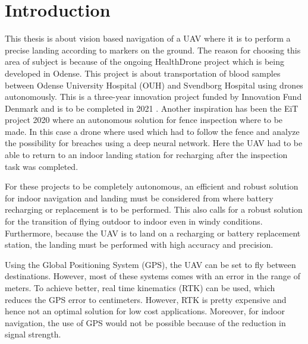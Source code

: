 \documentclass[../Head/report.tex]{subfiles}
\begin{document}
\section{Introduction}

This thesis is about vision based navigation of a UAV where it is to perform a precise landing according to markers on the ground. The reason for choosing this area of subject is because of the ongoing HealthDrone project which is being developed in Odense. This project is about transportation of blood samples between Odense University Hospital (OUH) and Svendborg Hospital using drones autonomously. This is a three-year innovation project funded by Innovation Fund Denmark and is to be completed in 2021 \cite{HealthDrone}. Another inspiration has been the EiT project 2020 where an autonomous solution for fence inspection where to be made. In this case a drone where used which had to follow the fence and analyze the possibility for breaches using a deep neural network. Here the UAV had to be able to return to an indoor landing station for recharging after the inspection task was completed.     

For these projects to be completely autonomous, an efficient and robust solution for indoor navigation and landing must be considered from where battery recharging or replacement is to be performed. This also calls for a robust solution for the transition of flying outdoor to indoor even in windy conditions. Furthermore, because the UAV is to land on a recharging or battery replacement station, the landing must be performed with high accuracy and precision.

Using the Global Positioning System (GPS), the UAV can be set to fly between destinations. However, most of these systems comes with an error in the range of meters. To achieve better, real time kinematics (RTK) can be used, which reduces the GPS error to centimeters. However, RTK is pretty expensive and hence not an optimal solution for low cost applications. Moreover, for indoor navigation, the use of GPS would not be possible because of the reduction in signal strength. 
\end{document}
